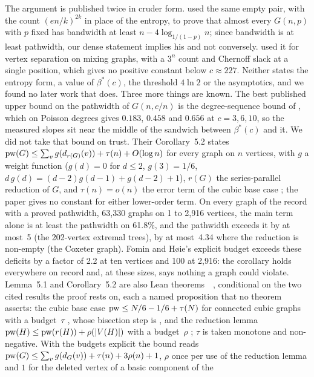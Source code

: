 The argument is published twice in cruder form. \citet{Turner1986} used the
same empty pair, with the count $(en/k)^{2k}$ in place of the entropy, to
prove that almost every $G(n,p)$ with $p$ fixed has bandwidth at least
$n-4\log_{1/(1-p)}n$; since bandwidth is at least pathwidth, our dense
statement implies his and not conversely. \citet{DiazPetitSernaTrevisan2001}
used it for vertex separation on mixing graphs, with a $3^{n}$ count and
Chernoff slack at a single position, which gives no positive constant below
$c\approx227$. Neither states the entropy form, a value of $\beta^{*}(c)$, the
threshold $4\ln2$ or the asymptotics, and we found no later work that does.
Three more things are known. The best published upper bound on the pathwidth
of $G(n,c/n)$ is the degree-sequence bound of \citet{EdwardsMcDermid2015},
which on Poisson degrees gives $0.183$, $0.458$ and $0.656$ at $c=3,6,10$,
so the measured slopes sit near the middle of the sandwich between
$\beta^{*}(c)$ and it. We did not take that bound on trust. Their Corollary~5.2 states
$\mathrm{pw}(G)\le\sum_{v}g(d_{r(G)}(v))+\tau(n)+O(\log n)$ for every graph on $n$
vertices, with $g$ a weight function ($g(d)=0$ for $d\le2$, $g(3)=1/6$,
$d\,g(d)=(d-2)g(d-1)+g(d-2)+1$), $r(G)$ the series-parallel reduction of
$G$, and $\tau(n)=o(n)$ the error term of the cubic base case
\citep[Theorem~5]{FominHoie2006}; the paper gives no constant for either
lower-order term. On every graph of the record with a proved pathwidth,
63,330 graphs on 1 to 2,916 vertices, the main term alone is at least the
pathwidth on 61.8\%, and the pathwidth exceeds it by at most~5 (the
202-vertex extremal trees), by at most~4.34 where the reduction is
non-empty (the Coxeter graph). Fomin and H{\o}ie's explicit budget exceeds
these deficits by a factor of 2.2 at ten vertices and 100 at 2,916: the
corollary holds everywhere on record and, at these sizes, says nothing a
graph could violate. Lemma~5.1 and Corollary~5.2 are also Lean
theorems~~, conditional
on the two cited results the proof rests on, each a named proposition that
no theorem asserts: the cubic base case $\mathrm{pw}\le N/6-1/6+\tau(N)$ for
connected cubic graphs with a budget~$\tau$ \citep[Theorem~5]{FominHoie2006},
whose bisection step is \citet{MonienPreis2006}, and the reduction lemma
$\mathrm{pw}(H)\le\mathrm{pw}(r(H))+\rho(|V(H)|)$ with a budget~$\rho$
\citep{KneisMolleRichterRossmanith2009}; $\tau$ is taken monotone and
non-negative. With the budgets explicit the bound reads
$\mathrm{pw}(G)\le\sum_v g(d_G(v))+\tau(n)+3\rho(n)+1$, $\rho$ once per use of the
reduction lemma and $1$ for the deleted vertex of a basic component of the
